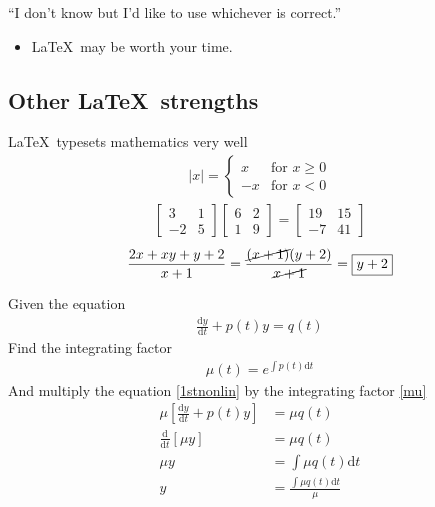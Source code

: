 \documentclass{beamer}                  %
\newcommand{\srule}{
	\rule{\textwidth}{1pt}\\
}
\newlength{\subsecwidth}
\newenvironment{slide}{
	\begin{frame} %
	\settowidth{\subsecwidth}{\insertsubsection} %
	\ifthenelse{\dimtest{\subsecwidth}{<}{1pt}}{ %
		\frametitle{\insertsection\\             %
		\vspace{-1ex}                            %
		\color{fore}\srule                       %
		\par                                     %
		\vspace{-3ex}                            %
		}
	}{                                           %
		\frametitle{\insertsection\ -- \insertsubsection\\ %
		\vspace{-1ex}                            %
		\color{fore}\srule                       %
		\par                                     %
		\vspace{-3ex}                            %
		}
	}
	\Large                                       %
}{
	\end{frame}
}
\begin{document}
\begin{slide}
	``I don't know but I'd like to use whichever is correct.''
	\begin{itemize}
		\item<2-> \LaTeX\ may be worth your time.
	\end{itemize}
\end{slide}

\subsection{Other \LaTeX\ strengths} %

\begin{slide}
	\LaTeX\ typesets mathematics very well
	\begin{align*}
		|x|=
		\begin{cases}
			x & \text{for } x\geq 0\\
			-x & \text{for } x < 0
		\end{cases}
	\end{align*}
	\begin{align*}
		\begin{bmatrix}
			3 & 1\\
			-2 & 5
		\end{bmatrix}
		\begin{bmatrix}
			6 & 2\\
			1 & 9
		\end{bmatrix}
		=
		\begin{bmatrix}
			19 & 15\\
			-7 & 41
		\end{bmatrix}
	\end{align*}
	\begin{align*}
		\frac{
			2x+xy+y+2
		}{
			x+1
		}
		=
		\frac{
			\cancel{(x+1)}(y+2)
		}{
			\cancel{x+1}
		}
		= \boxed{y+2}
	\end{align*}
\end{slide}

\begin{slide}
	\small
	Given the equation
	\begin{align} \label{1stnonlin}
		\frac{\mathrm{d}y}{\mathrm{d}t}+p(t)y=q(t)
	\end{align}
	Find the integrating factor
	\begin{align} \label{mu}
		\mu(t)=e^{\int p(t)\mathrm{d}t}
	\end{align}
	And multiply the equation \eqref{1stnonlin} by the integrating factor
	\eqref{mu}
	\begin{align*}
		\mu\left[
			\frac{\mathrm{d}y}{\mathrm{d}t}+p(t)y
		\right]
		&=\mu q(t)
		\\
		\frac{\mathrm{d}}{\mathrm{d}t}\left[
			\mu y
		\right]
		&=\mu q(t) \tag{product rule}
		\\
		\mu y&=\int \mu q(t) \mathrm{d}t
		\\
		y&=
		\boxed
		{\frac{
			\int \mu q(t)\mathrm{d}t
		}{ \mu }}
	\end{align*}
\end{slide}
\end{document}
